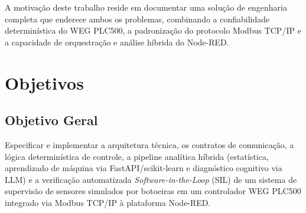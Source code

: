 A motivação deste trabalho reside em documentar uma solução de engenharia completa que enderece ambos os problemas, combinando a confiabilidade determinística do WEG PLC500, a padronização do protocolo Modbus TCP/IP e a capacidade de orquestração e análise híbrida do Node-RED.

\section{Objetivos}
\label{sec:objetivos}

\subsection{Objetivo Geral}
Especificar e implementar a arquitetura técnica, os contratos de comunicação, a lógica determinística de controle, a pipeline analítica híbrida (estatística, aprendizado de máquina via FastAPI/scikit-learn e diagnóstico cognitivo via LLM) e a verificação automatizada \textit{Software-in-the-Loop} (SIL) de um sistema de supervisão de sensores simulados por botoeiras em um controlador WEG PLC500 integrado via Modbus TCP/IP à plataforma Node-RED.

